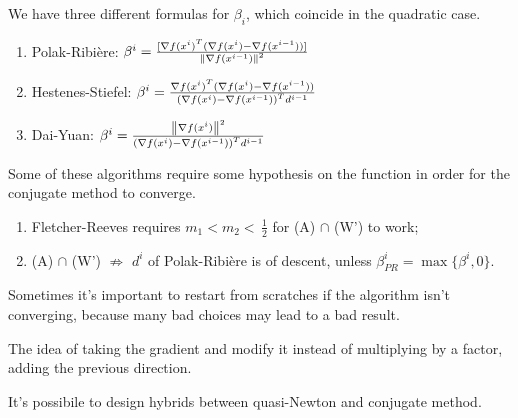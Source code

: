 \documentclass[computationalMathematics.tex]{subfiles}
\begin{document}

We have three different formulas for $\beta_i$, which coincide in the quadratic case.

\begin{enumerate}
  \item Polak-Ribi\`ere: $\beta^i = \frac{[\nabla {f(x^i)}^{T} (\nabla f(x^i) - \nabla f(x^{i-1}))]}{{\left\lVert\nabla f(x^{i-1})\right\rVert}^2}$  
  \item Hestenes-Stiefel: $\beta^i = \frac{{\nabla f(x^i)}^{T}(\nabla f(x^i) - \nabla f(x^{i-1}))}{{(\nabla f(x^i) - \nabla f(x^{i-1}))}^{T}d^{i-1}}$
    
  \item Dai-Yuan: $\beta^i = \frac{{\left\lVert\nabla f(x^i)\right\rVert}^2}{{(\nabla f(x^i) - \nabla f(x^{i-1}))}^{T} d^{i-1}}$
\end{enumerate}

Some of these algorithms require some hypothesis on the function in order for the conjugate method to converge.

\begin{enumerate}
  \item Fletcher-Reeves requires $m_1 < m_2 < \, \frac{1}{2}$ for (A) $\cap$ (W') to work;
  \item (A) $\cap$ (W') $\not\Longrightarrow$ $d^i$ of Polak-Ribière is of descent, unless $\beta^i_{PR} = \max \{\beta^i, 0\}$.
\end{enumerate}

Sometimes it's important to restart from scratches if the algorithm isn't converging, because many bad choices may lead to a bad result.

The idea of taking the gradient and modify it instead of multiplying by a factor, adding the previous direction.

It's possibile to design hybrids between quasi-Newton and conjugate method.
\end{document}
